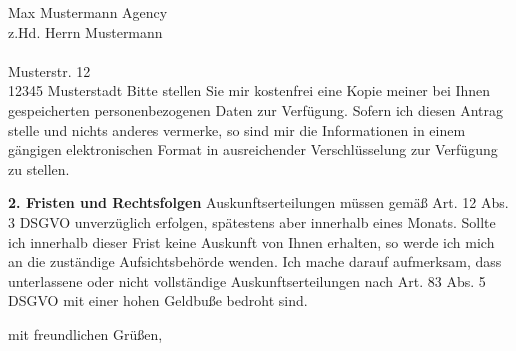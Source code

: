 \documentclass[a4paper, pagenumber=footmiddle, parskip=half,
	foldmarks=true,foldmarks=BmT,
	fromalign=right,  %
	fromphone=false, fromfax=false, fromemail=true, fromurl=true, fromlogo=true,
	fromrule=false, version=last]{scrlttr2}
\begin{document}
\begin{letter}{
	Max Mustermann Agency\\ 
	z.Hd. Herrn Mustermann\\ \ \\
	Musterstr. 12\\
	12345 Musterstadt
}
Bitte stellen Sie mir kostenfrei eine Kopie meiner bei Ihnen gespeicherten personenbezogenen Daten zur Verfügung. Sofern ich diesen Antrag stelle und nichts anderes vermerke, so sind mir die Informationen in einem gängigen elektronischen Format in ausreichender Verschlüsselung zur Verfügung zu stellen.

\textbf{2. Fristen und Rechtsfolgen}
Auskunftserteilungen müssen gemäß Art. 12 Abs. 3 DSGVO unverzüglich erfolgen, spätestens aber innerhalb eines Monats. Sollte ich innerhalb dieser Frist keine Auskunft von Ihnen erhalten, so werde ich mich an die zuständige Aufsichtsbehörde wenden. Ich mache darauf aufmerksam, dass unterlassene oder nicht vollständige Auskunftserteilungen nach Art. 83 Abs. 5 DSGVO mit einer hohen Geldbuße bedroht sind.

\closing{mit freundlichen Grüßen,}


\end{letter}
\end{document}
